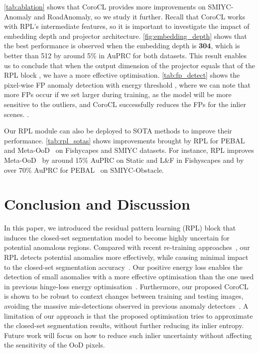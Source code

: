 \documentclass[10pt,twocolumn,letterpaper]{article}
\begin{document}
\cref{tab:ablation} shows that CoroCL provides more improvements on SMIYC-Anomaly and RoadAnomaly, so we study it further.
Recall that CoroCL works with RPL's intermediate features, so it is important to investigate the impact of embedding depth and projector architecture.
\cref{fig:embedding_depth} shows that the best performance is observed when the embedding depth is \textbf{304}, which is better than 512 by around 5\% in AuPRC for both datasets. This result enables us to conclude that when the output dimension of the projector  equals that of the RPL block , we  have a more effective optimisation. 
\cref{tab:fp_detect} shows the pixel-wise FP anomaly detection with energy threshold , where we can note that more FPs occur if we set larger  during training, as the model will be more sensitive to the outliers, and CoroCL successfully reduces the FPs for the inlier scenes.
. 

Our RPL module can also be deployed to SOTA methods to improve their performance. \cref{tab:rpl_sotas} shows improvements brought by RPL for PEBAL~\cite{tian2021pixel} and Meta-OoD~\cite{chan2021entropy} on Fishycapes and SMIYC datasets.
For instance, RPL improves Meta-OoD~\cite{chan2021entropy} by around 15\% AuPRC on Static and L\&F in Fishyscapes and by over 70\% AuPRC for PEBAL~\cite{tian2021pixel} on SMIYC-Obstacle. 
\vspace{-5pt}


\section{Conclusion and Discussion}
\vspace{-5pt}
In this paper, we introduced the residual pattern learning (RPL) block that induces the closed-set segmentation model to become highly uncertain for potential anomalous regions. 
Compared with recent re-training approaches~\cite{chan2021entropy,tian2021pixel,grcic2022densehybrid}, our RPL detects potential anomalies more effectively, while causing minimal impact to the closed-set segmentation accuracy~\cite{di2021pixel, jung2021standardized, hendrycks2019scaling}.
Our positive energy loss enables the detection of small anomalies with a more effective optimisation than the one used in previous hinge-loss energy optimisation~\cite{tian2021pixel}. 
Furthermore, our proposed CoroCL is shown to be robust to context changes between training and testing images, avoiding the massive  mis-detections observed in previous anomaly detectors~\cite{tian2021pixel,chan2021entropy,grcic2022densehybrid,di2021pixel,jung2021standardized}.
A limitation of our approach is that the proposed optimisation tries  to approximate the closed-set segmentation results, without further reducing its inlier entropy.
Future work will focus on how to reduce such inlier uncertainty without affecting the sensitivity of the OoD pixels.
{\small


}
\end{document}
